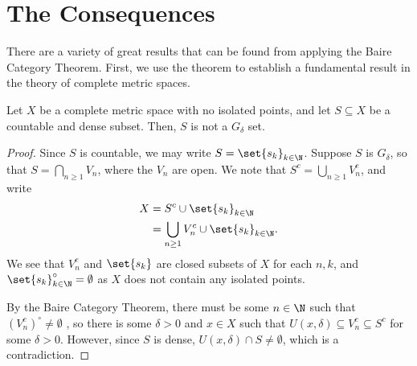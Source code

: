\documentclass[10pt]{mypackage}
\begin{document}
\section{The Consequences}%
There are a variety of great results that can be found from applying the Baire Category Theorem. First, we use the theorem to establish a fundamental result in the theory of complete metric spaces.
\begin{proposition}
  Let $X$ be a complete metric space with no isolated points, and let $S\subseteq X$ be a countable and dense subset. Then, $S$ is not a $G_{\delta}$ set.
\end{proposition}
\begin{proof}
  Since $S$ is countable, we may write $S = \set{s_k}_{k\in\N}$. Suppose $S$ is $G_{\delta}$, so that $S = \bigcap_{n\geq 1} V_n$, where the $V_n$ are open. We note that $S^{c} = \bigcup_{n\geq 1}V_n^{c}$, and write
  \begin{align*}
    X &= S^{c} \cup \set{s_k}_{k\in\N}\\
      &= \bigcup_{n\geq 1}V_n^{c} \cup \set{s_k}_{k\in\N}.
  \end{align*}
  We see that $V_n^{c}$ and $\set{s_k}$ are closed subsets of $X$ for each $n,k$, and $\set{s_k}_{k\in\N}^{\circ} = \emptyset$ as $X$ does not contain any isolated points.\newline

  By the Baire Category Theorem, there must be some $n\in\N$ such that $\left( V_n^{c} \right)^{\circ}\neq \emptyset$ , so there is some $\delta > 0$ and $x\in X$ such that $U\left( x,\delta \right)\subseteq V_n^{c}\subseteq S^{c}$ for some $\delta > 0$. However, since $S$ is dense, $U\left( x,\delta \right)\cap S \neq \emptyset$, which is a contradiction.
\end{proof}
\end{document}
